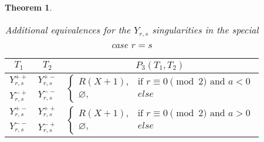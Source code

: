 \documentclass[noend]{amsproc}
\newtheorem{theorem}{Theorem}
\theoremstyle{definition}
\begin{document}
\begin{theorem}
\begin{table}[htb]
\centering
\caption{Additional equivalences for the $Y_{r,s}$ singularities in the
special case $r = s$}
\label{tab:Yrr_equivalences}
\begin{tabular}{|c|c||c|}
\hline

$T_1$ & $T_2$ & $P_3(T_1, T_2)$ \\
\hline\hline

$Y_{r,s}^{++}$ & $Y_{r,s}^{+-}$ &
\multirow{2}{*}{$\begin{cases}
  R(X+1),      &\!\text{if } r \equiv 0 \pmod{2} \text{ and } a < 0 \\
  \varnothing, &else
\end{cases}$}
\\ \cline{1-2}

$Y_{r,s}^{-+}$ & $Y_{r,s}^{--}$ &
\\ \hline

$Y_{r,s}^{+-}$ & $Y_{r,s}^{++}$ &
\multirow{2}{*}{$\begin{cases}
  R(X+1),      &\!\text{if } r \equiv 0 \pmod{2} \text{ and } a > 0 \\
  \varnothing, &else
\end{cases}$}
\\ \cline{1-2}

$Y_{r,s}^{--}$ & $Y_{r,s}^{-+}$ &
\\ \hline

\end{tabular}
\end{table}

\end{theorem}
\end{document}
